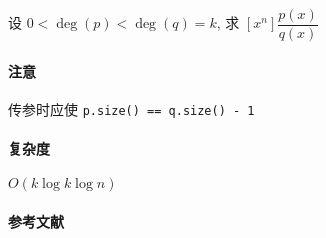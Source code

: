 设 \(0<\deg(p)<\deg(q)=k\), 求 \(\left[x^n\right]\dfrac{p(x)}{q(x)}\)

\paragraph{注意}

传参时应使 \verb|p.size() == q.size() - 1|

\paragraph{复杂度}

\(O(k\log k\log n)\)

\paragraph{参考文献} \cite{bostan2021simple}
